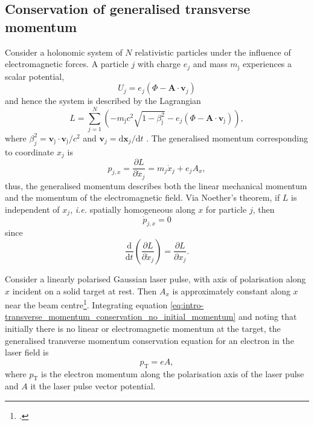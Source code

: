 \subsection{Conservation of generalised transverse momentum}\label{sec:intro_conservation-generalised-mometum}
Consider a holonomic system of $N$ relativistic particles under the influence of electromagnetic forces. A particle $j$ with charge $e_j$ and mass $m_\mathrm{j}$ experiences a scalar potential,
\begin{equation}
	U_{j} = e_j(\Phi - \mathbf{A} \cdot \mathbf{v}_{j})
\end{equation}
and hence the system is described by the Lagrangian
\begin{equation}
	L = \sum^N_{j=1}\left( - m_\mathrm{j}c^2\sqrt{1-\beta^2_\mathrm{j}} - e_j(\Phi - \mathbf{A} \cdot \mathbf{v}_\mathrm{j}) \right),
\end{equation}
where $\beta^2_j = \mathbf{v}_\mathrm{j}\cdot\mathbf{v}_\mathrm{j} /c^2$ and $\mathbf{v}_j = \mathrm{d}\mathbf{x}_j/\mathrm{d}t$ \cite{goldsteinClassicalMechanics2013}.
The generalised momentum corresponding to coordinate $x_j$ is
\begin{equation}
	p_{j,x} = \frac{\partial L}{\partial \dot{x}_j} = m_j\dot{x}_j + e_jA_x,
\end{equation}
thus, the generalised momentum describes both the linear mechanical momentum and the momentum of the electromagnetic field. Via Noether's theorem, if $L$ is independent of $x_j$, \textit{i.e.} spatially homogeneous along $x$ for particle $j$, then 
\begin{equation}\label{eq:intro-transverse_momentum_differential_equation}
	\dot{p}_{j,x} = 0
\end{equation}
since
\begin{equation}
	\frac{\mathrm{d}}{\mathrm{d}t}\left(\frac{\partial L}{\partial \dot{x}_j}\right) = \frac{\partial L}{\partial x_j}.
\end{equation}

Consider a linearly polarised Gaussian laser pulse, with axis of polarisation along $x$ incident on a solid target at rest. Then $A_x$ is approximately constant along $x$ near the beam centre\footcite{Constant relative to the scale of typical electron trajectories in such an interaction.}. Integrating equation \ref{eq:intro-transverse_momentum_conservation_no_initial_momentum} and noting that initially there is no linear or electromagnetic momentum at the target, the generalised transverse momentum conservation equation for an electron in the laser field is
\begin{equation}\label{eq:intro-transverse_momentum_conservation_no_initial_momentum}
	p_\mathrm{T} = eA,
\end{equation}
where $p_\mathrm{T}$ is the electron momentum along the polarisation axis of the laser pulse and $A$ it the laser pulse vector potential.

